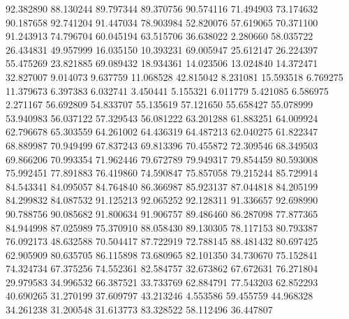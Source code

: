 92.382890
88.130244
89.797344
89.370756
90.574116
71.494903
73.174632
90.187658
92.741204
91.447034
78.903984
52.820076
57.619065
70.371100
91.243913
74.796704
60.045194
63.515706
36.638022
2.280660
58.035722
26.434831
49.957999
16.035150
10.393231
69.005947
25.612147
26.224397
55.475269
23.821885
69.089432
18.934361
14.023506
13.024840
14.372471
32.827007
9.014073
9.637759
11.068528
42.815042
8.231081
15.593518
6.769275
11.379673
6.397383
6.032741
3.450441
5.155321
6.011779
5.421085
6.586975
2.271167
56.692809
54.833707
55.135619
57.121650
55.658427
55.078999
53.940983
56.037122
57.329543
56.081222
63.201288
61.883251
64.009924
62.796678
65.303559
64.261002
64.436319
64.487213
62.040275
61.822347
68.889987
70.949499
67.837243
69.813396
70.455872
72.309546
68.349503
69.866206
70.993354
71.962446
79.672789
79.949317
79.854459
80.593008
75.992451
77.891883
76.419860
74.590847
75.857058
79.215244
85.729914
84.543341
84.095057
84.764840
86.366987
85.923137
87.044818
84.205199
84.299832
84.087532
91.125213
92.065252
92.128311
91.336657
92.698990
90.788756
90.085682
91.800634
91.906757
89.486460
86.287098
77.877365
84.944998
87.025989
75.370910
88.058430
89.130305
78.117153
80.793387
76.092173
48.632588
70.504417
87.722919
72.788145
88.481432
80.697425
62.905909
80.635705
86.115898
73.680965
82.101350
34.730670
75.152841
74.324734
67.375256
74.552361
82.584757
32.673862
67.672631
76.271804
29.979583
34.996532
66.387521
33.733769
62.884791
77.543203
62.852293
40.690265
31.270199
37.609797
43.213246
4.553586
59.455759
44.968328
34.261238
31.200548
31.613773
83.328522
58.112496
36.447807
